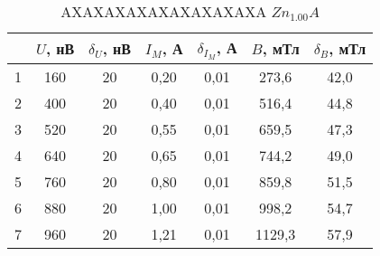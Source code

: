 \begin{table}
\centering
\caption{AXAXAXAXAXAXAXAXAXA $Zn_1.00A$}
\begin{tabular}{|c|c|c|c|c|c|c|}
\hline
 & $U$, нВ & $\delta_U$, нВ & $I_M$, А & $\delta_{I_M}$, А & $B$, мТл & $\delta_B$, мТл \\
\hline
1 & 160 & 20 & 0,20 & 0,01 & 273,6 & 42,0 \\
\cline{1-7}
2 & 400 & 20 & 0,40 & 0,01 & 516,4 & 44,8 \\
\cline{1-7}
3 & 520 & 20 & 0,55 & 0,01 & 659,5 & 47,3 \\
\cline{1-7}
4 & 640 & 20 & 0,65 & 0,01 & 744,2 & 49,0 \\
\cline{1-7}
5 & 760 & 20 & 0,80 & 0,01 & 859,8 & 51,5 \\
\cline{1-7}
6 & 880 & 20 & 1,00 & 0,01 & 998,2 & 54,7 \\
\cline{1-7}
7 & 960 & 20 & 1,21 & 0,01 & 1129,3 & 57,9 \\
\cline{1-7}
\hline
\end{tabular}
\end{table}
